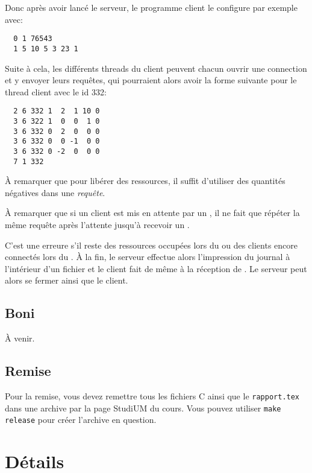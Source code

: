 \documentclass{article}
\begin{document}
Donc après avoir lancé le serveur, le programme client le configure par
exemple avec:
\begin{verbatim}
  0 1 76543 
  1 5 10 5 3 23 1 
\end{verbatim}
Suite à cela, les différents threads du client peuvent chacun ouvrir une
connection et y envoyer leurs requêtes, qui pourraient alors avoir la forme
suivante pour le thread client avec le id 332:
\begin{verbatim}
  2 6 332 1  2  1 10 0 
  3 6 322 1  0  0  1 0 
  3 6 332 0  2  0  0 0
  3 6 332 0  0 -1  0 0
  3 6 332 0 -2  0  0 0
  7 1 332 
\end{verbatim}

À remarquer que pour libérer des ressources, il suffit d'utiliser des
quantités négatives dans une \emph{requête}.

À remarquer que si un client est mis en attente par un , il ne fait
que répéter la même requête après l'attente jusqu'à recevoir un .

C'est une erreure s’il reste des ressources occupées lors du  ou des
clients encore connectés lors du .  À la fin, le serveur effectue
alors l’impression du journal à l’intérieur d’un fichier et le client fait
de même à la réception de .  Le serveur peut alors se fermer ainsi
que le client.

\subsection{Boni}

À venir. 

\subsection{Remise}

Pour la remise, vous devez remettre tous les fichiers C ainsi que le
\texttt{rapport.tex} dans une archive  par la page StudiUM du cours.  Vous pouvez utiliser \texttt{make release} pour
créer l'archive en question.  

\section{Détails}
\end{document}
